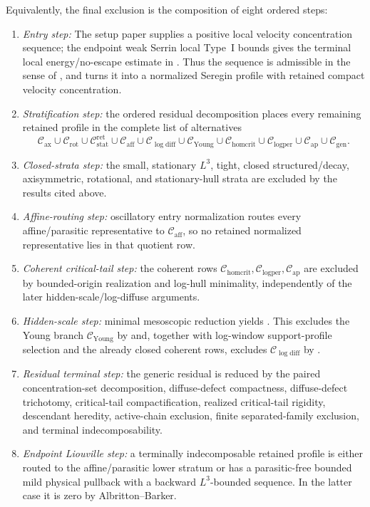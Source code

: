 \documentclass[11pt]{amsart}
\numberwithin{equation}{section}
\theoremstyle{plain}
\theoremstyle{definition}
\theoremstyle{remark}
\newcommand{\Cax}{\mathcal C_{\mathrm{ax}}}
\newcommand{\Crot}{\mathcal C_{\mathrm{rot}}}
\newcommand{\Cstat}{\mathcal C_{\mathrm{stat}}^{\mathrm{ret}}}
\newcommand{\Caff}{\mathcal C_{\mathrm{aff}}}
\newcommand{\Cgen}{\mathcal C_{\mathrm{gen}}}
\newcommand{\Chomcrit}{\mathcal C_{\mathrm{homcrit}}}
\newcommand{\Clogper}{\mathcal C_{\mathrm{logper}}}
\newcommand{\Capcrit}{\mathcal C_{\mathrm{ap}}}
\newcommand{\Cyoung}{\mathcal C_{\mathrm{Young}}}
\newcommand{\Clogdiff}{\mathcal C_{\log\mathrm{diff}}}
\begin{document}
Equivalently, the final exclusion is the composition of eight ordered steps:
\begin{enumerate}[label=\textup{(\arabic*)}]
   \item \emph{Entry step:} The setup paper supplies a positive local
   velocity concentration sequence; the endpoint weak Serrin local Type~I bounds
    gives the terminal local
   energy/no-escape estimate in
   .  Thus the sequence is
   admissible in the sense of , and
    turns it into a normalized Seregin profile
   with retained compact velocity concentration.
   \item \emph{Stratification step:} the ordered residual decomposition
   places every remaining retained profile in the complete list of alternatives
   \[
      \Cax\cup\Crot\cup\Cstat\cup\Caff
      \cup\Clogdiff\cup\Cyoung\cup\Chomcrit\cup\Clogper\cup\Capcrit
      \cup\Cgen .
   \]
   \item \emph{Closed-strata step:} the small, stationary \(L^3\),
   tight, closed structured/decay, axisymmetric, rotational, and
   stationary-hull strata are excluded by the results cited above.
   \item \emph{Affine-routing step:} oscillatory entry normalization routes every
   affine/parasitic representative to \(\Caff\), so no retained normalized
   representative lies in that quotient row.
   \item \emph{Coherent critical-tail step:} the coherent rows
   \(\Chomcrit,\Clogper,\Capcrit\) are excluded by bounded-origin realization
   and log-hull minimality, independently of the later hidden-scale/log-diffuse
   arguments.
   \item \emph{Hidden-scale step:} minimal mesoscopic reduction yields
   .  This excludes the
   Young branch \(\Cyoung\) by  and, together
   with log-window support-profile selection and the already closed coherent
   rows, excludes \(\Clogdiff\) by .
   \item \emph{Residual terminal step:} the generic residual is reduced
   by the paired concentration-set decomposition, diffuse-defect compactness,
   diffuse-defect trichotomy, critical-tail compactification, realized
   critical-tail rigidity, descendant heredity, active-chain exclusion, finite
   separated-family exclusion, and terminal indecomposability.
   \item \emph{Endpoint Liouville step:} a terminally indecomposable
   retained profile is either routed to the affine/parasitic lower stratum
   or has a parasitic-free bounded mild physical pullback with a backward
   \(L^3\)-bounded sequence.  In the latter case it is zero by
   Albritton--Barker.
\end{enumerate}
\end{document}
